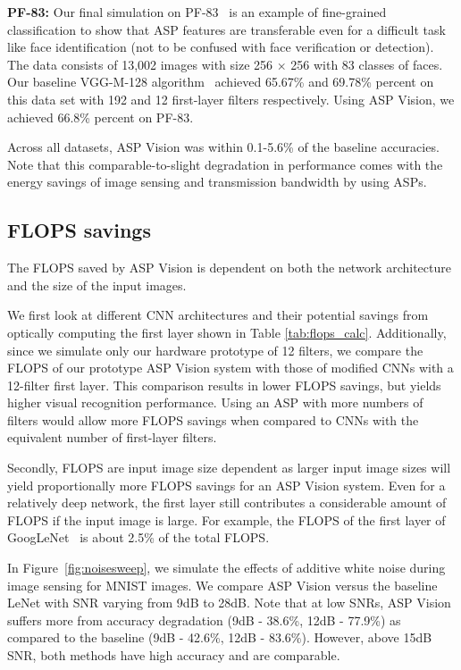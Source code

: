 \documentclass[10pt,twocolumn,letterpaper]{article}
\begin{document}
\textbf{PF-83:} Our final simulation on PF-83~\cite{becker2013evaluating} is an example of fine-grained classification to show that ASP features are transferable even for a difficult task like face identification (not to be confused with face verification or detection). The data consists of 13,002 images with size 256 $\times$ 256 with 83 classes of faces. Our baseline VGG-M-128 algorithm~\cite{VGG} achieved 65.67\% and 69.78\% percent on this data set with 192 and 12 first-layer filters respectively. Using ASP Vision, we achieved 66.8\% percent on PF-83. 

Across all datasets, ASP Vision was within 0.1-5.6\% of the baseline accuracies. Note that this comparable-to-slight degradation in performance comes with the energy savings of image sensing and transmission bandwidth by using ASPs. 

\subsection{FLOPS savings}
The FLOPS saved by ASP Vision is dependent on both the network architecture and the size of the input images. 

We first look at different CNN architectures and their potential savings from optically computing the first layer shown in Table \ref{tab:flops_calc}. Additionally, since we simulate only our hardware prototype of 12 filters, we compare the FLOPS of our prototype ASP Vision system with those of modified CNNs with a 12-filter first layer. This comparison results in lower FLOPS savings, but yields higher visual recognition performance. Using an ASP with more numbers of filters would allow more FLOPS savings when compared to CNNs with the equivalent number of first-layer filters. 

Secondly, FLOPS are input image size dependent as larger input image sizes will yield proportionally more FLOPS savings for an ASP Vision system. Even for a relatively deep network, the first layer still contributes a considerable amount of FLOPS if the input image is large. For example, the FLOPS of the first layer of GoogLeNet~\cite{szegedy2014going} is about 2.5\% of the total FLOPS.

In Figure~\ref{fig:noisesweep}, we simulate the effects of additive white noise during image sensing for MNIST images. We compare ASP Vision versus the baseline LeNet with SNR varying from 9dB to 28dB. Note that at low SNRs, ASP Vision suffers more from accuracy degradation (9dB - 38.6\%, 12dB - 77.9\%) as compared to the baseline (9dB - 42.6\%, 12dB - 83.6\%). However, above 15dB SNR, both methods have high accuracy and are comparable. 
\end{document}
